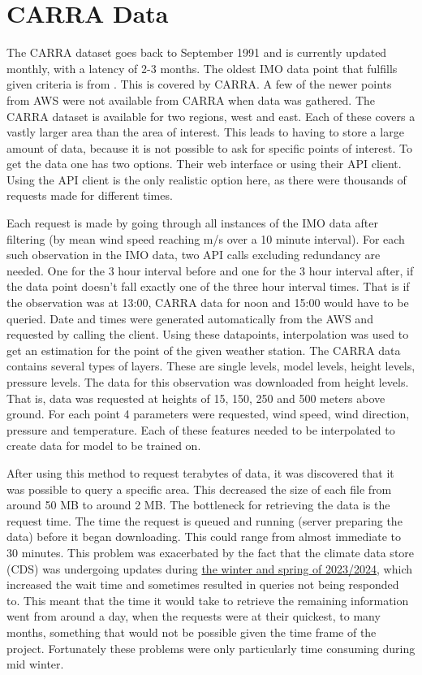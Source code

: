 \section{CARRA Data}
The CARRA dataset goes back to September 1991 and is currently updated monthly, with a latency of 2-3 months\cite{carra_information}. The oldest IMO data point that fulfills given criteria is from \startDateVedur. This is covered by CARRA. A few of the newer points from AWS were not available from CARRA when data was gathered. The CARRA dataset is available for two regions, west and east. Each of these covers a vastly larger area than the area of interest. This leads to having to store a large amount of data, because it is not possible to ask for specific points of interest. To get the data one has two options. Their web interface or using their API client. Using the API client is the only realistic option here, as there were thousands of requests made for different times.

Each request is made by going through all instances of the IMO data after filtering (by mean wind speed reaching \averageWindSpeedLimit m/s over a 10 minute interval). For each such observation in the IMO data, two API calls excluding redundancy are needed. One for the 3 hour interval before and one for the 3 hour interval after, if the data point doesn't fall exactly one of the three hour interval times. That is if the observation was at 13:00, CARRA data for noon and 15:00 would have to be queried. Date and times were generated automatically from the AWS and requested by calling the client. Using these datapoints, interpolation was used to get an estimation for the point of the given weather station. The CARRA data contains several types of layers. These are single levels, model levels, height levels, pressure levels. The data for this observation was downloaded from height levels. That is, data was requested at heights of 15, 150, 250 and 500 meters above ground. For each point 4 parameters were requested, wind speed, wind direction, pressure and temperature. Each of these features needed to be interpolated to create data for model to be trained on.

After using this method to request terabytes of data, it was discovered that it was possible to query a specific area. This decreased the size of each file from around 50 MB to around 2 MB. The bottleneck for retrieving the data is the request time. The time the request is queued and running (server preparing the data) before it began downloading. This could range from almost immediate to 30 minutes. This problem was exacerbated by the fact that the climate data store (CDS) was undergoing updates during \href{https://forum.ecmwf.int/t/a-new-cds-soon-to-be-launched-expect-some-disruptions/1607}{the winter and spring of 2023/2024}, which increased the wait time and sometimes resulted in queries not being responded to. This meant that the time it would take to retrieve the remaining information went from around a day, when the requests were at their quickest, to many months, something that would not be possible given the time frame of the project. Fortunately these problems were only particularly time consuming during mid winter.

